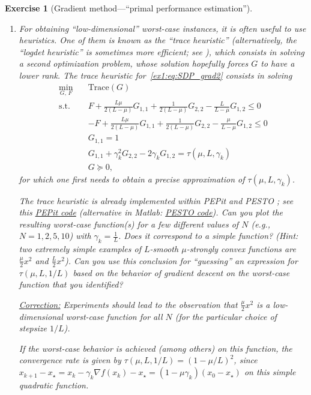 \documentclass[11pt,a4paper]{article}
\newcommand{\pesto}{{PESTO }}
\newcommand{\pepit}{{PEPit }}
\newcommand{\correction}[1]{{{\color{blue}\underline{Correction:} #1}}}
\newcommand{\correction}[1]{}
\newtheorem{exercise}{Exercise}
\begin{document}
\begin{exercise}[Gradient method---``primal performance estimation'']
\begin{enumerate}
	\item For obtaining ``low-dimensional'' worst-case instances, it is often useful to use heuristics. One of them is known as the ``trace heuristic'' (alternatively, the ``logdet heuristic'' is sometimes more efficient; see ), which consists in solving a second optimization problem, whose solution hopefully forces $G$ to have a lower rank. The trace heuristic for~\eqref{ex1:eq:SDP_grad2} consists in solving
	\begin{equation}\label{ex1:eq:trace}
	\begin{aligned}
				\min_{G,\, F} \quad & \mathrm{Trace}(G)\\
			\text{s.t. } \quad & F + \tfrac{L\mu}{2(L-\mu)} G_{1,1}+\tfrac{1}{2(L-\mu)}G_{2,2}-\tfrac{L}{L-\mu}G_{1,2}\leqslant 0\\
			&-F + \tfrac{L\mu}{2(L-\mu)} G_{1,1}+\tfrac{1}{2(L-\mu)}G_{2,2}-\tfrac{\mu}{L-\mu}G_{1,2}\leqslant 0\\
			&G_{1,1}= 1\\
			&G_{1,1}+\gamma_k ^2 G_{2,2}-2\gamma_k G_{1,2}=\tau(\mu,L,\gamma_k)\\
			&G\succcurlyeq 0,
	\end{aligned}
	\end{equation}
	for which one first needs to obtain a precise approximation of $\tau(\mu,L,\gamma_k)$. 
	
	The trace heuristic is already implemented within \pepit and \pesto; see this \href{https://github.com/PerformanceEstimation/Learning-Performance-Estimation/tree/main/Codes/Jupyter/Exercise01.ipynb}{\pepit code} (alternative in Matlab: \href{https://github.com/PerformanceEstimation/Learning-Performance-Estimation/blob/main/Codes/Matlab/Exercise1_dimReduction.m}{\pesto code}). Can you plot the resulting worst-case function(s) for a few different values of $N$ (e.g., $N=1,2,5,10$) with $\gamma_k=\tfrac{1}{L}$. Does it correspond to a simple function? (Hint: two extremely simple examples of $L$-smooth $\mu$-strongly convex functions are $\tfrac{\mu}{2}x^2$ and $\tfrac{L}{2}x^2$). Can you use this conclusion for ``guessing'' an expression for $\tau(\mu,L,1/L)$ based on the behavior of gradient descent on the worst-case function that you identified?
	
	\correction{Experiments should lead to the observation that $\tfrac{\mu}{2}x^2$ is a low-dimensional worst-case function for all $N$ (for the particular choice of stepsize $1/L$).
	
	If the worst-case behavior is achieved (among others) on this function, the convergence rate is given by $\tau(\mu,L,1/L)=(1-\mu/L)^2$, since $x_{k+1}-x_\star=x_k-\gamma_k \nabla f(x_k)-x_\star=(1-\mu\gamma_k)(x_0-x_\star)$ on this simple quadratic function.}


\end{enumerate}
\end{exercise}
\end{document}
